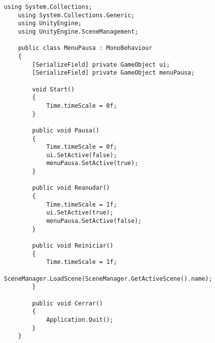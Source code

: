 \begin{lstlisting}[frame=single]
    using System.Collections;
    using System.Collections.Generic;
    using UnityEngine;
    using UnityEngine.SceneManagement;

    public class MenuPausa : MonoBehaviour
    {
        [SerializeField] private GameObject ui;
        [SerializeField] private GameObject menuPausa;

        void Start()
        {
            Time.timeScale = 0f;
        }

        public void Pausa()
        {
            Time.timeScale = 0f;
            ui.SetActive(false);
            menuPausa.SetActive(true);
        }

        public void Reanudar()
        {
            Time.timeScale = 1f;
            ui.SetActive(true);
            menuPausa.SetActive(false);
        }

        public void Reiniciar()
        {
            Time.timeScale = 1f;
            SceneManager.LoadScene(SceneManager.GetActiveScene().name);
        }

        public void Cerrar()
        {
            Application.Quit();
        }
    }
\end{lstlisting}
